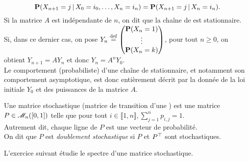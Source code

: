 $$\P(X_{n+1}=j \,|\, X_0=i_0, \dots, X_n = i_n) = \P(X_{n+1} = j \,|\, X_n = i_n).$$
Si la matrice $A$ est indépendante de $n$, on dit que la chaîne de  est stationnaire. Si, dans ce dernier cas, on pose $Y_n \defeq \begin{pmatrix} \P(X_n = 1) \\ \vdots \\ \P(X_n = k) \end{pmatrix}$, pour tout $n \geqslant 0$, on obtient $Y_{n+1} = A Y_n$ et donc $Y_n = A^n Y_0$. \\
Le comportement (probabiliste) d'une chaîne de  stationnaire, et notamment son comportement asymptotique, est donc entièrement décrit par la donnée de la loi initiale $Y_0$ et des puissances de la matrice $A$. 

\begin{defi}
    Une matrice stochastique (matrice de transition d'une ) est une matrice $P \in \M_n([0, 1])$ telle que pour tout $i \in \llbracket 1, n \rrbracket, \sum\limits_{j=1}^{n} p_{i,j} = 1$. \\ Autrement dit, chaque ligne de $P$ est une vecteur de probabilité. \\
    On dit que $P$ est \emph{doublement stochastique} si $P$ et $\Trsp{P}$ sont stochastiques.
\end{defi}

L'exercice suivant étudie le spectre d'une matrice stochastique. 

